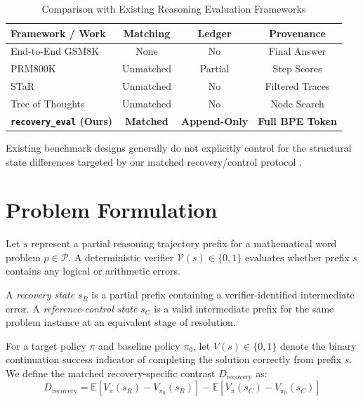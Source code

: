 \documentclass[conference]{IEEEtran}
\begin{document}
\begin{table}[htbp]
\caption{Comparison with Existing Reasoning Evaluation Frameworks}
\label{tab:related_work}
\centering
\begin{tabularx}{\columnwidth}{Xccc}
\toprule
\textbf{Framework / Work} & \textbf{Matching} & \textbf{Ledger} & \textbf{Provenance} \\
\midrule
End-to-End GSM8K \cite{cobbe2021gsm8k} & None & No & Final Answer \\
PRM800K \cite{lightman2023process} & Unmatched & Partial & Step Scores \\
STaR \cite{zelikman2022star} & Unmatched & No & Filtered Traces \\
Tree of Thoughts \cite{yao2023tree} & Unmatched & No & Node Search \\
\textbf{\texttt{recovery\_eval} (Ours)} & \textbf{Matched} & \textbf{Append-Only} & \textbf{Full BPE Token} \\
\bottomrule
\end{tabularx}
\end{table}

Existing benchmark designs generally do not explicitly control for the structural state differences targeted by our matched recovery/control protocol \cite{liao2021benchmarking, sambasivan2021everyone}.

\section{Problem Formulation}
Let $s$ represent a partial reasoning trajectory prefix for a mathematical word problem $p \in \mathcal{P}$. A deterministic verifier $\mathcal{V}(s) \in \{0, 1\}$ evaluates whether prefix $s$ contains any logical or arithmetic errors.

A \textit{recovery state} $s_R$ is a partial prefix containing a verifier-identified intermediate error. A \textit{reference-control state} $s_C$ is a valid intermediate prefix for the same problem instance at an equivalent stage of resolution.

For a target policy $\pi$ and baseline policy $\pi_0$, let $V(s) \in \{0, 1\}$ denote the binary continuation success indicator of completing the solution correctly from prefix $s$. We define the matched recovery-specific contrast $D_{\text{recovery}}$ as:
\begin{equation}
D_{\text{recovery}} = \mathbb{E}[V_{\pi}(s_R) - V_{\pi_0}(s_R)] - \mathbb{E}[V_{\pi}(s_C) - V_{\pi_0}(s_C)]
\end{equation}
\end{document}
